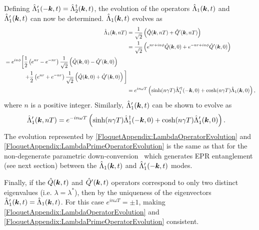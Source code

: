 Defining $\hat{\Lambda}_1'(-\bm{k}, t) = \hat{\Lambda}_2^\dagger(\bm{k}, t)$, the evolution of the operators $\hat{\Lambda}_1(\bm{k}, t)$ and $\hat{\Lambda}_1'(\bm{k}, t)$ can now be determined. $\hat{\Lambda}_1(\bm{k}, t)$ evolves as
\begin{align}
    \hat{\Lambda}_1(\vect{k}, nT) &= \frac{1}{\sqrt{2}} \left(\hat{Q}(\vect{k}, nT) + \hat{Q}'(\vect{k}, nT) \right) \\
        &= \frac{1}{\sqrt{2}} \left( e^{nr + i n\phi} \hat{Q}(\vect{k}, 0) + e^{-nr + i n \phi}\hat{Q}'(\vect{k}, 0)\right) \\
        \begin{split}
            &=  e^{i n \phi} \bigg[ \frac{1}{2}\left( e^{nr} - e^{-nr}\right)\frac{1}{\sqrt{2}}\left(\hat{Q}(\vect{k}, 0) - \hat{Q}'(\vect{k}, 0) \right) \\
            &\relphantom{=e^{i n \phi}\bigg[} + \frac{1}{2} \left( e^{nr} + e^{-nr}\right)\frac{1}{\sqrt{2}} \left( \hat{Q}(\vect{k}, 0) + \hat{Q}'(\vect{k}, 0)\right)\bigg]
        \end{split}\\
        &= e^{i n \omega T} \left( \sinh(n\gamma T) \hat{\Lambda}_1'^\dagger(-\vect{k}, 0) + \cosh(n \gamma T) \hat{\Lambda}_1(\vect{k}, 0)\right), \label{FloquetAppendix:LambdaOperatorEvolution}
\end{align}
where $n$ is a positive integer. Similarly, $\hat{\Lambda}_1'(\bm{k}, t)$ can be shown to evolve as
\begin{align}
    \hat{\Lambda}_1'(\vect{k}, nT) &= e^{-i n \omega T} \left( \sinh(n \gamma T) \hat{\Lambda}_1^\dagger(-\vect{k}, 0) + \cosh(n \gamma T) \hat{\Lambda}_1'(\vect{k}, 0)\right). \label{FloquetAppendix:LambdaPrimeOperatorEvolution}
\end{align}
The evolution represented by \eqref{FloquetAppendix:LambdaOperatorEvolution} and \eqref{FloquetAppendix:LambdaPrimeOperatorEvolution} is the same as that for the non-degenerate parametric down-conversion~\citep{WallsMilburn} which generates EPR entanglement (see next section) between the $\hat{\Lambda}_1(\bm{k}, t)$ and $\hat{\Lambda}_1'(-\bm{k}, t)$ modes.

Finally, if the $\hat{Q}(\bm{k}, t)$ and $\hat{Q}'(\bm{k}, t)$ operators correspond to only two distinct eigenvalues (i.e. $\lambda = \lambda^*$), then by the uniqueness of the eigenvectors $\hat{\Lambda}_1'(\bm{k}, t) = \hat{\Lambda}_1(\bm{k}, t)$. For this case $\displaystyle e^{i n\omega T} = \pm 1$, making \eqref{FloquetAppendix:LambdaOperatorEvolution} and \eqref{FloquetAppendix:LambdaPrimeOperatorEvolution} consistent.

